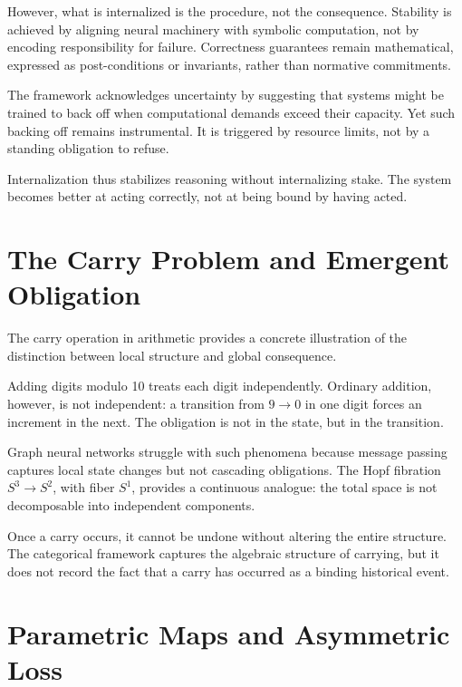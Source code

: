 \documentclass[11pt]{article}
\begin{document}
However, what is internalized is the procedure, not the consequence. Stability
is achieved by aligning neural machinery with symbolic computation, not by
encoding responsibility for failure. Correctness guarantees remain mathematical,
expressed as post-conditions or invariants, rather than normative commitments.

The framework acknowledges uncertainty by suggesting that systems might be
trained to back off when computational demands exceed their capacity. Yet such
backing off remains instrumental. It is triggered by resource limits, not by a
standing obligation to refuse.

Internalization thus stabilizes reasoning without internalizing stake. The system
becomes better at acting correctly, not at being bound by having acted.


\section{The Carry Problem and Emergent Obligation}

The carry operation in arithmetic provides a concrete illustration of the
distinction between local structure and global consequence.

Adding digits modulo 10 treats each digit independently. Ordinary addition,
however, is not independent: a transition from $9 \rightarrow 0$ in one digit
forces an increment in the next. The obligation is not in the state, but in the
transition.

Graph neural networks struggle with such phenomena because message passing
captures local state changes but not cascading obligations. The Hopf fibration
$S^3 \rightarrow S^2$, with fiber $S^1$, provides a continuous analogue: the
total space is not decomposable into independent components.

Once a carry occurs, it cannot be undone without altering the entire structure.
The categorical framework captures the algebraic structure of carrying, but it
does not record the fact that a carry has occurred as a binding historical event.

\section{Parametric Maps and Asymmetric Loss}
\end{document}
